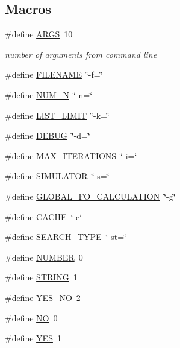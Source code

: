 \subsection*{Macros}
\begin{DoxyCompactItemize}
\item 
\#define \hyperlink{optjrParam__helper_8hh_aff1b09d6630c6c0942f78171e74c1b9d}{A\-R\-G\-S}~10
\begin{DoxyCompactList}\small\item\em number of arguments from command line \end{DoxyCompactList}\item 
\#define \hyperlink{optjrParam__helper_8hh_a8de29f7c8bbf1a81cc6e71ac602032d3}{F\-I\-L\-E\-N\-A\-M\-E}~\char`\"{}-\/f=\char`\"{}
\item 
\#define \hyperlink{optjrParam__helper_8hh_a4f7be859c7225cea6daef529ce8b737a}{N\-U\-M\-\_\-\-N}~\char`\"{}-\/n=\char`\"{}
\item 
\#define \hyperlink{optjrParam__helper_8hh_aaf0b4413f90241f1be4ff1235595706f}{L\-I\-S\-T\-\_\-\-L\-I\-M\-I\-T}~\char`\"{}-\/k=\char`\"{}
\item 
\#define \hyperlink{optjrParam__helper_8hh_ad72dbcf6d0153db1b8d8a58001feed83}{D\-E\-B\-U\-G}~\char`\"{}-\/d=\char`\"{}
\item 
\#define \hyperlink{optjrParam__helper_8hh_a0a3abbca80bc98e7abcb3ae73abe0f14}{M\-A\-X\-\_\-\-I\-T\-E\-R\-A\-T\-I\-O\-N\-S}~\char`\"{}-\/i=\char`\"{}
\item 
\#define \hyperlink{optjrParam__helper_8hh_ad8a5d8c4e3342fb668142df792e93f38}{S\-I\-M\-U\-L\-A\-T\-O\-R}~\char`\"{}-\/s=\char`\"{}
\item 
\#define \hyperlink{optjrParam__helper_8hh_a48549690ff4f612c62edddb87aacc438}{G\-L\-O\-B\-A\-L\-\_\-\-F\-O\-\_\-\-C\-A\-L\-C\-U\-L\-A\-T\-I\-O\-N}~\char`\"{}-\/g\char`\"{}
\item 
\#define \hyperlink{optjrParam__helper_8hh_a43fd55aa78bd891ebbd6a450f5eecce4}{C\-A\-C\-H\-E}~\char`\"{}-\/c\char`\"{}
\item 
\#define \hyperlink{optjrParam__helper_8hh_a29f84654cbf6a3432582ca010e00f097}{S\-E\-A\-R\-C\-H\-\_\-\-T\-Y\-P\-E}~\char`\"{}-\/st=\char`\"{}
\item 
\#define \hyperlink{optjrParam__helper_8hh_abc544a4ed22112e62773c113652c5063}{N\-U\-M\-B\-E\-R}~0
\item 
\#define \hyperlink{optjrParam__helper_8hh_a0f4d394a3ab4e09bff60f714c66dc5ee}{S\-T\-R\-I\-N\-G}~1
\item 
\#define \hyperlink{optjrParam__helper_8hh_a0966d7215d44b0eb30c4082965114e45}{Y\-E\-S\-\_\-\-N\-O}~2
\item 
\#define \hyperlink{optjrParam__helper_8hh_a996bde01ecac342918f0a2c4e7ce7bd5}{N\-O}~0
\item 
\#define \hyperlink{optjrParam__helper_8hh_a7ebc9a785e5ab85457c98595aac81589}{Y\-E\-S}~1
\end{DoxyCompactItemize}
